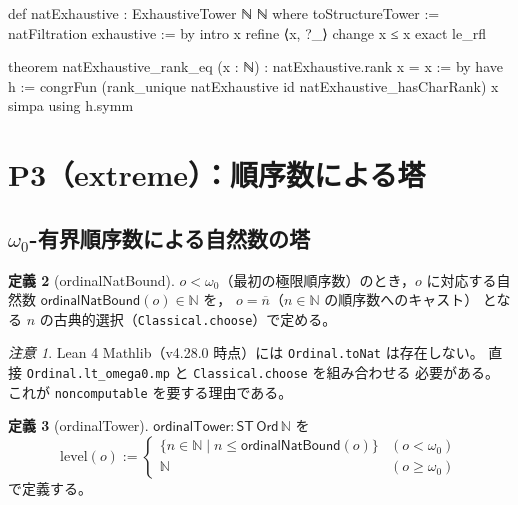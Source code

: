 \documentclass[a4paper,11pt]{ltjsarticle}
\theoremstyle{definition}
\newtheorem{definition}{定義}[section]
\theoremstyle{plain}
\theoremstyle{remark}
\newtheorem{remark}[definition]{注意}
\newcommand{\ST}{\mathsf{ST}}    %
\newcommand{\lev}{\mathrm{level}}
\begin{document}
\begin{leancode}[caption={natExhaustive の定義とランク等式（P2: canonical）}]
def natExhaustive : ExhaustiveTower ℕ ℕ where
  toStructureTower := natFiltration
  exhaustive := by
    intro x
    refine ⟨x, ?_⟩
    change x ≤ x
    exact le_rfl

theorem natExhaustive_rank_eq (x : ℕ) :
    natExhaustive.rank x = x := by
  have h := congrFun (rank_unique natExhaustive id
                        natExhaustive_hasCharRank) x
  simpa using h.symm
\end{leancode}

\section{P3（extreme）：順序数による塔}\label{sec:ordinal}

\subsection{$\omega_0$-有界順序数による自然数の塔}

\begin{definition}[ordinalNatBound]
$o < \omega_0$（最初の極限順序数）のとき，$o$ に対応する自然数
$\mathsf{ordinalNatBound}(o) \in \mathbb{N}$ を，
$o = \overline{n}$（$n \in \mathbb{N}$ の順序数へのキャスト）
となる $n$ の古典的選択（\texttt{Classical.choose}）で定める。

\begin{remark}
Lean 4 Mathlib（v4.28.0 時点）には \texttt{Ordinal.toNat} は存在しない。
直接 \texttt{Ordinal.lt\_omega0.mp} と \texttt{Classical.choose} を組み合わせる
必要がある。これが \texttt{noncomputable} を要する理由である。
\end{remark}
\end{definition}

\begin{definition}[ordinalTower]
$\mathsf{ordinalTower} : \ST\,\mathsf{Ord}\,\mathbb{N}$ を
\[
  \lev(o) :=
  \begin{cases}
    \{n \in \mathbb{N} \mid n \leq \mathsf{ordinalNatBound}(o)\} & (o < \omega_0) \\
    \mathbb{N} & (o \geq \omega_0)
  \end{cases}
\]
で定義する。
\end{definition}
\end{document}
